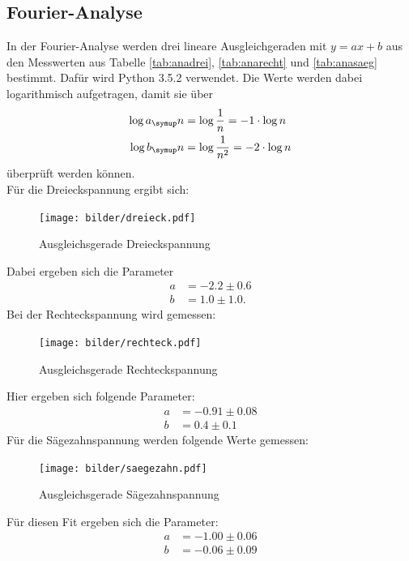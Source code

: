\subsection{Fourier-Analyse}
In der Fourier-Analyse werden drei lineare Ausgleichgeraden mit $y = ax + b$ aus den Messwerten
aus Tabelle \ref{tab:anadrei}, \ref{tab:anarecht} und \ref{tab:anasaeg} bestimmt.
Dafür wird Python 3.5.2 verwendet. Die Werte werden dabei logarithmisch aufgetragen,
damit sie über
\begin{align}
  \log{a_\su{n}} &= \log{\frac{1}{n}} = -1\cdot \log{n} \\
  \log{b_\su{n}} &= \log{\frac{1}{n^2}} = -2\cdot \log{n} \\ \label{eqn:fehler}
\end{align}
überprüft werden können. \\
Für die Dreieckspannung ergibt sich:

\begin{figure}[!h]
  \centering
  \texttt{[image: bilder/dreieck.pdf]}
  \caption{Ausgleichsgerade Dreieckspannung}
  \label{fig:fitdrei}
\end{figure}
\par
Dabei ergeben sich die Parameter
\begin{align*}
  a &= -2.2 ± 0.6 \\
  b &= 1.0 ± 1.0.
\end{align*}
\newpage
Bei der Rechteckspannung wird gemessen:

\begin{figure}[!h]
  \centering
  \texttt{[image: bilder/rechteck.pdf]}
  \caption{Ausgleichsgerade Rechteckspannung}
  \label{fig:fitrecht}
\end{figure}
\par
Hier ergeben sich folgende Parameter:
\begin{align*}
  a &= -0.91 ± 0.08 \\
  b &= 0.4 ± 0.1
\end{align*}
\newpage
Für die Sägezahnspannung werden folgende Werte gemessen:

\begin{figure}[!h]
  \centering
  \texttt{[image: bilder/saegezahn.pdf]}
  \caption{Ausgleichsgerade Sägezahnspannung}
  \label{fig:fitsäge}
\end{figure}
\par
Für diesen Fit ergeben sich die Parameter:
\begin{align*}
  a &= -1.00 ± 0.06 \\
  b &= -0.06 ± 0.09
\end{align*}

